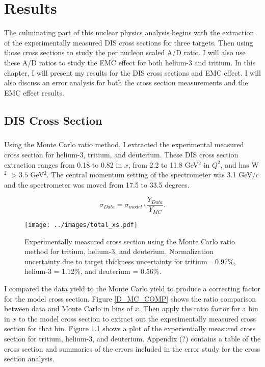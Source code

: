 
\chapter{Results}
The culminating part of this nuclear physics analysis begins with the extraction of the experimentally measured DIS cross sections for three targets. Then using those cross sections to study the per nucleon scaled A/D ratio. I will also use these A/D ratios to study the EMC effect for both helium-3 and tritium. In this chapter, I will present my results for the DIS cross sections and EMC effect. I will also discuss an error analysis for both the cross section measurements and the EMC effect results. 
\section{DIS Cross Section}
\paragraph{}Using the Monte Carlo ratio method, I extracted the experimental measured cross section for helium-3, tritium, and deuterium. These DIS cross section extraction ranges from 0.18 to 0.82 in $x$, from 2.2 to 11.8 GeV$^2$ in $Q^2$, and has W$^2$ $>3.5$ GeV$^2$. The central momentum setting of the spectrometer was 3.1 GeV/c and the spectrometer was moved from 17.5 to 33.5 degrees.


\begin{equation}
\sigma_{Data} = \sigma_{model} \cdot \frac{Y_{Data}}{Y_{MC}}. \nonumber
\end{equation}
\begin{figure}
	\texttt{[image: ../images/total\_xs.pdf]}
	\caption{Experimentally measured cross section using the Monte Carlo ratio method for tritium, helium-3, and deuterium. Normalization uncertainty due to target thickness uncertainty for tritium= 0.97\%, helium-3 = 1.12\%, and deuterium = 0.56\%.}
    \label{CCplot}
\end{figure}
I compared the data yield to the Monte Carlo yield to produce a correcting factor for the model cross section. Figure \ref{D_MC_COMP} shows the ratio comparison between data and Monte Carlo in bins of $x$. Then apply the ratio factor for a bin in $x$ to the model cross section to extract out the experimentally measured cross section for that bin. Figure \ref{CCplot} shows a plot of the experientially measured cross section for tritium, helium-3, and deuterium. Appendix (?) contains a table of the cross section and summaries of the errors included in the error study for the cross section analysis. 

